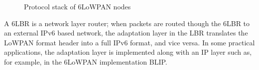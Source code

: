 \begin{figure}[htbp]
  \begin{center}
    \leavevmode
    \caption{Protocol stack of 6LoWPAN nodes}
    \label{fig:protocol stack}
  \end{center}
\end{figure}

A 6LBR is a network layer router; when packets are routed though the 6LBR to an external IPv6 based network, the adaptation layer in the LBR translates the LoWPAN format header into a full IPv6 format, and
vice versa. In some practical applications, the adaptation layer is implemented along with an IP
layer such as, for example, in the 6LoWPAN implementation BLIP.

